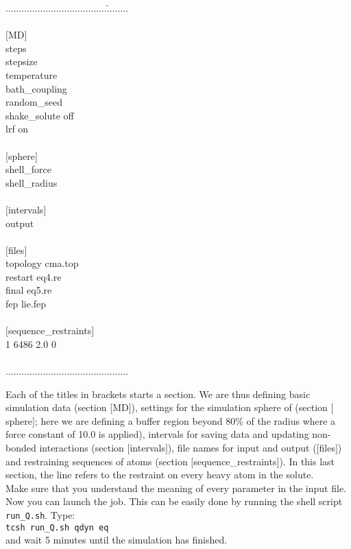 \documentclass[a4paper,12pt]{article}
\newcommand{\runsh}{\texttt{run{\_}Q.sh}}
\begin{document}
\begin{tabbing}
......................................\=........\\
\\
$[$MD$]$ \\
steps \\
stepsize\\
temperature\\
bath\_coupling\\
random\_seed\\
shake\_solute\>              off\\
lrf\>                       on\\
\\
$[$sphere$]$ \\
shell\_force\\
shell\_radius\\
\\
$[$intervals$]$ \\
output\\
\\
$[$files$]$ \\
topology\>     cma.top\\
restart\>      eq4.re\\
final\>        eq5.re\\
fep\>          lie.fep\\
\\
$[$sequence\_restraints$]$\\
1 6486 2.0 0\\
\\
..............................................\\
\end{tabbing}

Each of the titles in brackets  starts a section. We are thus defining
basic simulation data (section  $[$MD$]$), settings for the simulation
sphere of (section $[$sphere$]$; here  we are defining a buffer region
beyond 80\% of the radius where  a force constant of 10.0 is applied),
intervals  for  saving  data   and  updating  non-bonded  interactions
(section   $[$intervals$]$),  file   names   for   input  and   output
($[$files$]$)   and   restraining    sequences   of   atoms   (section
$[$sequence\_restraints$]$). In this last  section, the line refers to
the restraint on every heavy atom  in the solute.\\ Make sure that you
understand the meaning of every parameter  in the input file.  Now you
can  launch the  job. This  can be  easily done  by running  the shell
script {\runsh}. Type:\\ {\texttt {tcsh run\_Q.sh qdyn eq}}\\ and wait
5 minutes until the simulation has finished.\\
\end{document}
